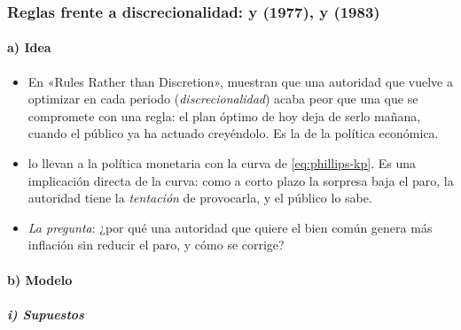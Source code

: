 \documentclass[11pt]{article}
\begin{document}
\subsubsection{Reglas frente a discrecionalidad:  y  (1977),  y  (1983)}\label{sec:kydland-prescott}

\paragraph{a) Idea}

\begin{itemize}
\item En «Rules Rather than Discretion», \textcite{KydlandPrescott1977Rules} muestran que una autoridad que vuelve a optimizar en cada periodo (\emph{discrecionalidad}) acaba peor que una que se compromete con una regla: el plan óptimo de hoy deja de serlo mañana, cuando el público ya ha actuado creyéndolo. Es la  de la política económica.
\item \textcite{BarroGordon1983Positive} lo llevan a la política monetaria con la curva de  \eqref{eq:phillips-kp}. Es una implicación directa de la curva: como a corto plazo la sorpresa baja el paro, la autoridad tiene la \emph{tentación} de provocarla, y el público lo sabe.
\item \emph{La pregunta}: ¿por qué una autoridad que quiere el bien común genera más inflación sin reducir el paro, y cómo se corrige?
\end{itemize}

\paragraph{b) Modelo}

\subparagraph{i) Supuestos}
\end{document}
